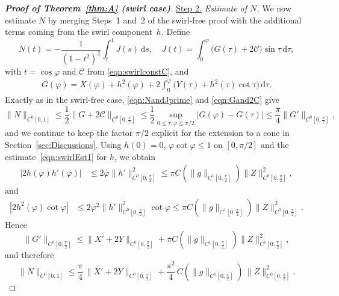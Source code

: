 \documentclass{amsart}
\newcommand{\mcC}{\mathcal{C}}
\begin{document}
\begin{proof}[\textbf{Proof of Theorem~\ref{thm:A} (swirl case)}]
\noindent\underline{Step 2.} \emph{Estimate of $N$.}
We now estimate $N$ by merging Steps~1 and~2 of the swirl-free proof with the additional terms coming from the swirl component~$h$.
Define
\[
N(t) = -\frac{1}{(1-t^2)^2}\int_t^1 J(s)\,\mathrm{d}s,
\quad 
J(t) = \int_0^{\varphi} \bigl(G(\tau)+2\mathcal{C}\bigr)\sin\tau\,\mathrm{d}\tau,
\]
with $t=\cos\varphi$ and $\mcC$ from \eqref{eqn:swirlconstC}, and 
\begin{align}\label{eqn:coneG}
G(\varphi) = X(\varphi) + h^2(\varphi) + 2\int_0^{\varphi} \bigl( Y(\tau) + h^2(\tau)\cot\tau \bigr)\,\mathrm{d}\tau.
\end{align}
Exactly as in the swirl-free case,  \eqref{eqn:NandJprime} and \eqref{eqn:Gand2C} give
\[
\|N\|_{C^0[0,1]} \le \frac12 \|G+2\mathcal{C}\|_{C^0[0,\frac{\pi}{2}]}
\le \frac12 \sup_{0\le\tau,\varphi\le\pi/2} |G(\varphi)-G(\tau)|
\le \frac{\pi}{4} \|G'\|_{C^0[0,\frac{\pi}{2}]},
\]
and we continue to keep the factor $\pi/2$ explicit for the extension to a cone in Section~\ref{sec:Discussions}.
Using $h(0)=0$, $\varphi\cot\varphi\le1$ on $[0,\pi/2]$ and the estimate~\eqref{eqn:swirlEst1} for $h$, we obtain
\begin{align*}
|2h(\varphi)h'(\varphi)|
&\le 2\varphi\|h'\|_{C^{0}[0,\frac{\pi}{2}]}^{2}
\le \pi C(\|g\|_{C^{1}[0,\frac{\pi}{2}]})\|Z\|_{C^{0}[0,\frac{\pi}{2}]}^{2},
\end{align*}
and 
\begin{align*}
|2h^{2}(\varphi)\cot\varphi|
&\le 2\varphi^{2}\|h'\|_{C^{0}[0,\frac{\pi}{2}]}^{2}\cot\varphi
\le \pi C(\|g\|_{C^{1}[0,\frac{\pi}{2}]})\|Z\|_{C^{0}[0,\frac{\pi}{2}]}^{2}.
\end{align*}
Hence
\[
\|G'\|_{C^{0}[0,\frac{\pi}{2}]}
\le \|X'+2Y\|_{C^{0}[0,\frac{\pi}{2}]} + \pi C(\|g\|_{C^{1}[0,\frac{\pi}{2}]})\|Z\|_{C^{0}[0,\frac{\pi}{2}]}^{2},
\]
and therefore
\begin{equation}\label{eqn:swirlEstN}
\|N\|_{C^{0}[0,1]}
\le \frac{\pi}{4}\,\|X'+2Y\|_{C^{0}[0,\frac{\pi}{2}]}
+ \frac{\pi^{2}}{4}\,C(\|g\|_{C^{1}[0,\frac{\pi}{2}]})\,\|Z\|_{C^{0}[0,\frac{\pi}{2}]}^{2}.
\end{equation}



\end{proof}
\end{document}
